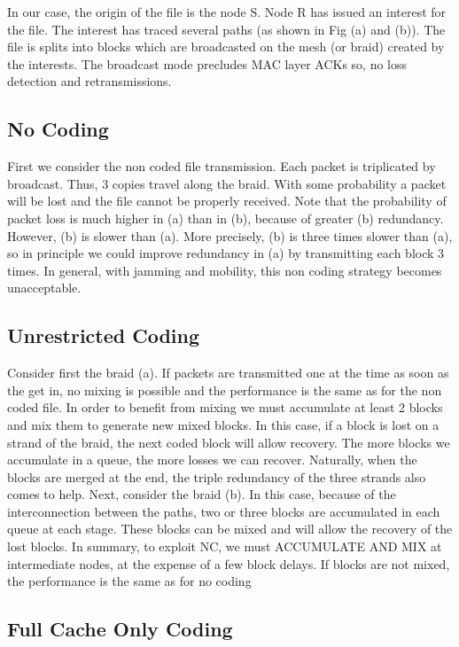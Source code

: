 	 	 	
In our case, the origin of the file is the node S. Node R has issued an interest for the file. The interest has traced several paths (as shown in Fig (a) and (b)). The file is splits into blocks which are broadcasted on the mesh (or braid) created by the interests. The broadcast mode precludes MAC layer ACKs so, no loss detection and retransmissions.

\subsection{No Coding}
	 	 	
First we consider the non coded file transmission. Each packet is triplicated by broadcast. Thus, 3 copies travel along the braid. With some probability a packet will be lost and the file cannot be properly received. Note that the probability of packet loss is much higher in (a) than in (b), because of greater (b) redundancy. However, (b) is slower than (a). More precisely, (b) is three times slower than (a), so in principle we could improve redundancy in (a) by transmitting each block 3 times. In general, with jamming and mobility, this non coding strategy becomes unacceptable.

\subsection{Unrestricted Coding}
	 	 	
 Consider first the braid (a). If packets are transmitted one at the time as soon as the get in, no mixing is possible and the performance is the same as for the non coded file.
In order to benefit from mixing we must accumulate at least 2 blocks and mix them to generate new mixed blocks. In this case, if a block is lost on a strand of the braid, the next coded block will allow recovery. The more blocks we accumulate in a queue, the more losses we can recover. Naturally, when the blocks are merged at the end, the triple redundancy of the three strands also comes to help. Next, consider the braid (b). In this case, because of the interconnection between the paths, two or three blocks are accumulated in each queue at each stage. These blocks can be mixed and will allow the recovery of the lost blocks. In summary, to exploit NC, we must ACCUMULATE AND MIX at intermediate nodes, at the expense of a few block delays. If blocks are not mixed, the performance is the same as for no coding


\subsection{Full Cache Only Coding}
	 	 	
